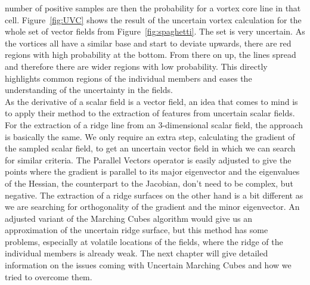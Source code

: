 number of positive samples are then the probability for a vortex core
line in that cell. Figure~\ref{fig:UVC} shows the result of the
uncertain vortex calculation for the whole set of vector fields from
Figure~\ref{fig:spaghetti}. The set is very uncertain. As the vortices
all have a similar base and start to deviate upwards, there are red
regions with high probability at the bottom. From there on up, the lines
spread and therefore there are wider regions with low probability. This
directly highlights common regions of the individual members and eases
the understanding of the uncertainty in the fields.\\
\indent As the derivative of a scalar field is a vector field, an idea
that comes to mind is to apply their method to the extraction of
features from uncertain scalar fields. For the extraction of a ridge
line from an 3-dimensional scalar field, the approach is basically the
same. We only require an extra step, calculating the gradient of the
sampled scalar field, to get an uncertain vector field in which we can
search for similar criteria. The Parallel Vectors operator is easily
adjusted to give the points where the gradient is parallel to its major
eigenvector and the eigenvalues of the Hessian, the counterpart to the
Jacobian, don't need to be complex, but negative. The extraction of a
ridge surfaces on the other hand is a bit different as we are searching
for orthogonality of the gradient and the minor eigenvector. An adjusted
variant of the Marching Cubes algorithm would give us an approximation
of the uncertain ridge surface, but this method has some problems,
especially at volatile locations of the fields, where the ridge of the
individual members is already weak. The next chapter will give detailed
information on the issues coming with Uncertain Marching Cubes and how
we tried to overcome them.

